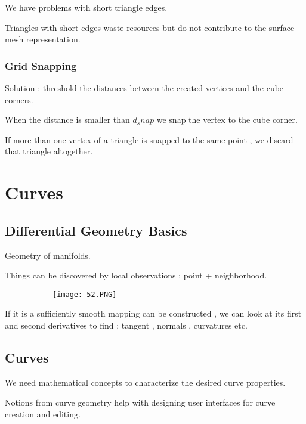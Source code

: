 \documentclass{article}
\begin{document}
We have problems with short triangle edges.

Triangles with short edges waste resources but do not contribute to the surface mesh representation.

\subsubsection{Grid Snapping}

Solution : threshold the distances between the created vertices and the cube corners.

When the distance is smaller than $d_snap$ we snap the vertex to the cube corner.

If more than one vertex of a triangle is snapped to the same point , we discard that triangle altogether.

\section{Curves}

\subsection{Differential Geometry Basics}

Geometry of manifolds.

Things can be discovered by local observations : point + neighborhood.

    \begin{figure}[ht!]
  \centering
  \begin{subfigure}[b]{0.5\linewidth}
    \texttt{[image: 52.PNG]}
  \end{subfigure}
\end{figure}

If it is a sufficiently smooth mapping can be constructed , we can look at its first and second derivatives to find : tangent , normals , curvatures etc.


\vspace{50mm}

\subsection{Curves}

We need mathematical concepts to characterize the desired curve properties.

Notions from curve geometry help with designing user interfaces for curve creation and editing.
\end{document}
